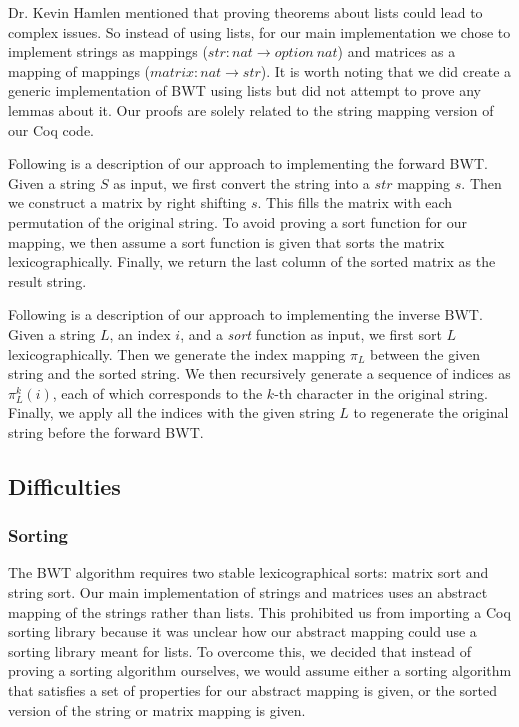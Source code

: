 \documentclass[11pt,letterpaper,]{article}
\begin{document}
Dr. Kevin Hamlen mentioned that proving theorems about lists could lead to
complex issues. So instead of using lists, for our main implementation we chose
to implement strings as mappings ($str: nat \rightarrow option\ nat$) and
matrices as a mapping of mappings ($matrix: nat \rightarrow str$). It is worth
noting that we did create a generic implementation of BWT using lists but did
not attempt to prove any lemmas about it. Our proofs are solely related to the
string mapping version of our Coq code.

Following is a description of our approach to implementing the forward BWT.
Given a string $S$ as input, we first convert the string into a $str$ mapping
$s$. Then we construct a matrix by right shifting $s$. This fills the matrix
with each permutation of the original string. To avoid proving a sort function
for our mapping, we then assume a sort function is given that sorts the matrix
lexicographically. Finally, we return the last column of the sorted matrix as
the result string.

Following is a description of our approach to implementing the inverse BWT.
Given a string $L$, an index $i$, and a \emph{sort} function as input, we first
sort $L$ lexicographically. Then we generate the index mapping $\pi_L$ between
the given string and the sorted string. We then recursively generate a sequence
of indices as $\pi_L^k(i)$, each of which corresponds to the $k$-th character
in the original string. Finally, we apply all the indices with the given string
$L$ to regenerate the original string before the forward BWT.

\subsection{Difficulties}

\subsubsection{Sorting}

The BWT algorithm requires two stable lexicographical sorts: matrix sort and
string sort. Our main implementation of strings and matrices uses an abstract
mapping of the strings rather than lists. This prohibited us from importing a
Coq sorting library because it was unclear how our abstract mapping could use a
sorting library meant for lists. To overcome this, we decided that instead of
proving a sorting algorithm ourselves, we would assume either a sorting
algorithm that satisfies a set of properties for our abstract mapping is given,
or the sorted version of the string or matrix mapping is given.
\end{document}

